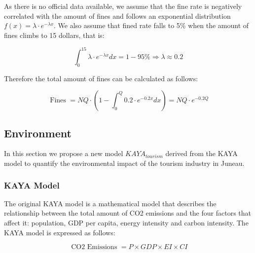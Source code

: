 As there is no official data available, we assume that the 
fine rate is negatively correlated with the amount of fines 
and follows an exponential distribution $f(x) = \lambda \cdot e^{-\lambda x}$. We also assume that 
fined rate falls to 5\% when the amount of fines climbs to 15 dollars, that is:

\begin{equation}
    \int_0^{15} \lambda \cdot e^{-\lambda x} d x=1-95 \% \Rightarrow \lambda \approx 0.2
\end{equation}

Therefore the total amount of fines can be calculated as follows:

\begin{equation}
    \text { Fines }=N Q \cdot\left(1-\int_0^Q 0.2 \cdot e^{-0.2 x} d x\right)=N Q \cdot e^{-0.2 Q}
\end{equation}




\subsection{Environment}


In this section we propose a new model $KAYA_{tourism}$ derived 
from the KAYA model to quantify the environmental impact of the tourism industry in Juneau.

\subsubsection{KAYA Model}

The original KAYA model is a mathematical model that 
describes the relationship between the total 
amount of CO2 emissions and the four factors 
that affect it: population, GDP per capita, energy intensity and carbon intensity.
 The KAYA model is expressed as follows:

\begin{equation}
    \text { CO2 Emissions }=P \times GDP \times E I \times C I
\end{equation}

